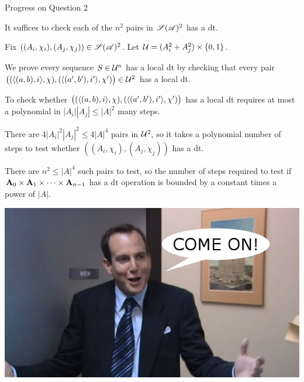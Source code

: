 \documentclass[notes=hide,12pt,xcolor=dvipsnames%
   ]{beamer}
\theoremstyle{definition}
\begin{document}
\begin{frame}[label=goal,shrink]{Progress on Question 2}

  It suffices to check each of the $n^2$ pairs in $\mathscr{S}(\mathscr{A})^2$ has a \glocal
  dt.

  Fix $((A_i, \chi_i), (A_j, \chi_j)) \in  \mathscr{S}(\mathscr{A})^2$.
  Let $\mathcal{U}  = (A_i^2 + A_j^2)\times \{0,1\}$.

  We prove every sequence $S \in \mathcal{U}^n$
  has a local dt by checking that every pair
  $\bigl( (\langle(a, b), i\rangle, \chi), (\langle(a', b'), i'\rangle, \chi')\bigr) \in \mathcal{U}^2$
  has a local dt.

  To check whether
  $\bigl( (\langle(a, b), i\rangle, \chi), (\langle(a', b'), i'\rangle, \chi')\bigr)$
  has a local dt requires at most
  a polynomial in $|A_i||A_j|\leq |A|^2$ many steps.

  There are $4|A_i|^2|A_j|^2 \leq 4|A|^4$ pairs in $\mathcal{U}^2$, 
  so it takes a polynomial %
  number of steps to test whether $((A_i, \chi_i), (A_j, \chi_j))$ has a \glocal dt.

  There are $n^2 \leq |A|^4$ such pairs to test, so the number of steps
  required to test if
  $\mathbf{A}_0 \times \mathbf{A}_1 \times \cdots \times \mathbf{A}_{n-1}$ has a dt
  operation is bounded by a constant times a power of $|A|$.
\end{frame}


\begin{frame}[label=pau]{}
\begin{center}
\bigskip\bigskip
\includegraphics[scale=.4]{gob2}
\end{center}
\end{frame}
\end{document}
